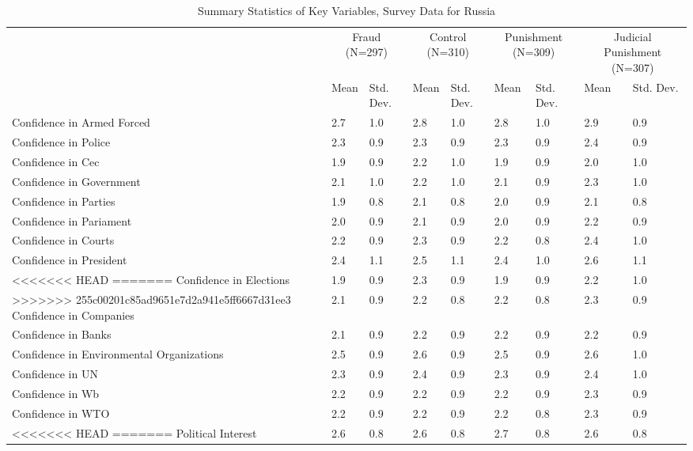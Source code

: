 \begin{table}

\caption{Summary Statistics of Key Variables, Survey Data for Russia}
\centering
\begin{tabular}[t]{llllllllll}
\toprule
\multicolumn{2}{c}{ } & \multicolumn{2}{c}{Fraud (N=297)} & \multicolumn{2}{c}{Control (N=310)} & \multicolumn{2}{c}{Punishment (N=309)} & \multicolumn{2}{c}{Judicial Punishment (N=307)} \\
\cmidrule(l{3pt}r{3pt}){3-4} \cmidrule(l{3pt}r{3pt}){5-6} \cmidrule(l{3pt}r{3pt}){7-8} \cmidrule(l{3pt}r{3pt}){9-10}
  &    & Mean & Std. Dev. & Mean  & Std. Dev.  & Mean   & Std. Dev.   & Mean    & Std. Dev.   \\
\midrule
Confidence in Armed Forced &  & 2.7 & 1.0 & 2.8 & 1.0 & 2.8 & 1.0 & 2.9 & 0.9\\
Confidence in Police &  & 2.3 & 0.9 & 2.3 & 0.9 & 2.3 & 0.9 & 2.4 & 0.9\\
Confidence in Cec &  & 1.9 & 0.9 & 2.2 & 1.0 & 1.9 & 0.9 & 2.0 & 1.0\\
Confidence in Government &  & 2.1 & 1.0 & 2.2 & 1.0 & 2.1 & 0.9 & 2.3 & 1.0\\
Confidence in Parties &  & 1.9 & 0.8 & 2.1 & 0.8 & 2.0 & 0.9 & 2.1 & 0.8\\
Confidence in Pariament &  & 2.0 & 0.9 & 2.1 & 0.9 & 2.0 & 0.9 & 2.2 & 0.9\\
Confidence in Courts &  & 2.2 & 0.9 & 2.3 & 0.9 & 2.2 & 0.8 & 2.4 & 1.0\\
Confidence in President &  & 2.4 & 1.1 & 2.5 & 1.1 & 2.4 & 1.0 & 2.6 & 1.1\\
<<<<<<< HEAD
=======
Confidence in Elections &  & 1.9 & 0.9 & 2.3 & 0.9 & 1.9 & 0.9 & 2.2 & 1.0\\
>>>>>>> 255c00201c85ad9651e7d2a941e5ff6667d31ee3
Confidence in Companies &  & 2.1 & 0.9 & 2.2 & 0.8 & 2.2 & 0.8 & 2.3 & 0.9\\
Confidence in Banks &  & 2.1 & 0.9 & 2.2 & 0.9 & 2.2 & 0.9 & 2.2 & 0.9\\
Confidence in Environmental Organizations &  & 2.5 & 0.9 & 2.6 & 0.9 & 2.5 & 0.9 & 2.6 & 1.0\\
Confidence in UN &  & 2.3 & 0.9 & 2.4 & 0.9 & 2.3 & 0.9 & 2.4 & 1.0\\
Confidence in Wb &  & 2.2 & 0.9 & 2.2 & 0.9 & 2.2 & 0.9 & 2.3 & 0.9\\
Confidence in WTO &  & 2.2 & 0.9 & 2.2 & 0.9 & 2.2 & 0.8 & 2.3 & 0.9\\
<<<<<<< HEAD
=======
Political Interest &  & 2.6 & 0.8 & 2.6 & 0.8 & 2.7 & 0.8 & 2.6 & 0.8\\

\end{tabular}
\end{table}
